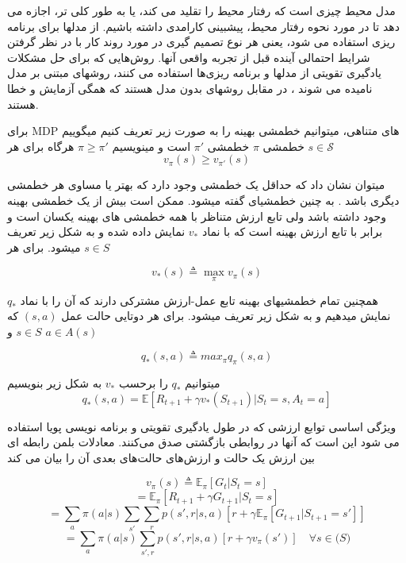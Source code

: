 مدل محیط چیزی است که رفتار محیط را تقلید می کند، یا به طور کلی تر، اجازه می دهد تا در مورد نحوه رفتار محیط، پیشبینی کارامدی داشته باشیم. از مدلها برای برنامه ریزی استفاده می شود، یعنی هر نوع تصمیم گیری در مورد روند کار با در نظر گرفتن شرایط احتمالی آینده قبل از تجربه واقعی آنها.
روش‌هایی که برای حل مشکلات یادگیری تقویتی از مدلها و برنامه ریزی‌ها استفاده می کنند، روشهای مبتنی بر مدل نامیده می شوند ، در مقابل روشهای بدون مدل هستند که همگی آزمایش و خطا هستند.

برای MDP های متناهی، می\nf توانیم خط\nf مشی بهینه را به صورت زیر تعریف کنیم
می\nf گوییم خط\nf مشی $\pi$  خط\nf مشی 
$\pi'$
است و می\nf نویسیم 
$\pi \ge \pi'$
هرگاه برای هر 
$s \in \mathcal{S}$
$$v_\pi(s) \ge v_{\pi'}(s)$$


می\nf توان نشان داد که حداقل یک خط\nf مشی وجود دارد که بهتر یا مساوی هر خط\nf مشی دیگری باشد
\cite{suttonbook}
. به چنین خط\nf مشی\nf ای  گفته می\nf شود. ممکن است بیش از یک خط\nf مشی بهینه وجود داشته باشد ولی تابع ارزش متناظر با همه خط\nf مشی \nf های بهینه یکسان است و برابر با تابع ارزش بهینه است که با نماد $v_*$ نمایش داده شده و به شکل زیر تعریف می\nf شود. برای هر $s \in S$

$$v_*(s) \triangleq \max_{\pi} v_\pi(s)$$


همچنین تمام خط\nf مشی\nf های بهینه تابع عمل-ارزش مشترکی دارند که آن را با نماد $q_*$ نمایش می\nf دهیم و به شکل زیر تعریف می\nf شود. برای هر دوتایی حالت عمل $(s,a)$ که $s \in S$ و $a \in A(s)$

$$q_*(s,a) \triangleq max_{\pi} q_\pi(s,a)$$

می\nf توانیم $q_*$ را برحسب $v_*$ به شکل زیر بنویسیم
$$ q_* (s,a) = \mathbb{E}[R_{t+1} + \gamma v_*(S_{t+1})| S_t=s, A_t=a]$$


ویژگی اساسی توابع ارزشی که در طول یادگیری تقویتی و برنامه نویسی پویا استفاده می شود این است که آنها در روابطی بازگشتی صدق می‌کنند. معادلات بلمن رابطه ای بین ارزش یک حالت و ارزش‌های حالت‌های بعدی آن را بیان می کند

$$v_\pi (s) \triangleq \mathbb{E}_\pi [G_t | S_t = s]$$
$$= \mathbb{E}_\pi [R_{t+1}+ \gamma G_{t+1}|S_t=s]$$
$$=\sum_{a} \pi(a|s) \sum_{s'}\sum_{r} p(s',r|s,a)[r+\gamma \mathbb{E}_\pi[G_{t+1}|S_{t+1}=s']]$$
$$=\sum_{a} \pi(a|s) \sum_{s',r} p(s',r|s,a)[r+\gamma v_\pi(s')] \quad \forall s \in \mathbb(S)$$





